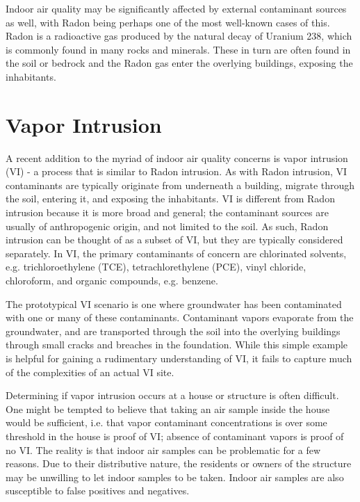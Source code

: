 \documentclass[../thesis.tex]{subfiles}
\begin{document}
Indoor air quality may be significantly affected by external contaminant sources as well, with Radon being perhaps one of the most well-known cases of this.
Radon is a radioactive gas produced by the natural decay of Uranium 238, which is commonly found in many rocks and minerals.
These in turn are often found in the soil or bedrock and the Radon gas enter the overlying buildings, exposing the inhabitants.

\section{Vapor Intrusion}

A recent addition to the myriad of indoor air quality concerns is vapor intrusion (VI) - a process that is similar to Radon intrusion.
As with Radon intrusion, VI contaminants are typically originate from underneath a building, migrate through the soil, entering it, and exposing the inhabitants.
VI is different from Radon intrusion because it is more broad and general; the contaminant sources are usually of anthropogenic origin, and not limited to the soil.
As such, Radon intrusion can be thought of as a subset of VI, but they are typically considered separately.
In VI, the primary contaminants of concern are chlorinated solvents, e.g. trichloroethylene (TCE), tetrachlorethylene (PCE), vinyl chloride, chloroform, and organic compounds, e.g. benzene.

The prototypical VI scenario is one where groundwater has been contaminated with one or many of these contaminants.
Contaminant vapors evaporate from the groundwater, and are transported through the soil into the overlying buildings through small cracks and breaches in the foundation.
While this simple example is helpful for gaining a rudimentary understanding of VI, it fails to capture much of the complexities of an actual VI site.

Determining if vapor intrusion occurs at a house or structure is often difficult.
One might be tempted to believe that taking an air sample inside the house would be sufficient, i.e. that vapor contaminant concentrations is over some threshold in the house is proof of VI; absence of contaminant vapors is proof of no VI.
The reality is that indoor air samples can be problematic for a few reasons.
Due to their distributive nature, the residents or owners of the structure may be unwilling to let indoor samples to be taken.
Indoor air samples are also susceptible to false positives and negatives.
\end{document}
